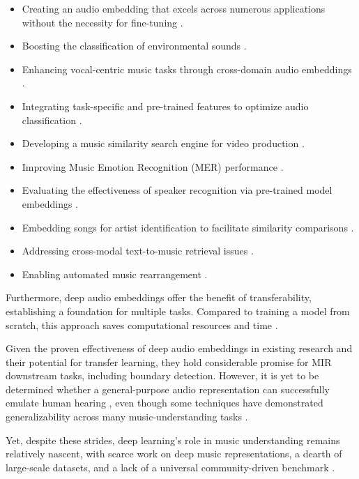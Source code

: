 \begin{itemize}
\item Creating an audio embedding that excels across numerous applications without the necessity for fine-tuning \cite{Turian2022HEAR:Representations}.
\item Boosting the classification of environmental sounds \cite{CramerLOOKEMBEDDINGS}.
\item Enhancing vocal-centric music tasks through cross-domain audio embeddings \cite{Kim2021LearningLoss}.
\item Integrating task-specific and pre-trained features to optimize audio classification \cite{Hung2022Feature-informedClassification}.
\item Developing a music similarity search engine for video production \cite{epidemic}.
\item Improving Music Emotion Recognition (MER) performance \cite{KohComparisonRecognition}.
\item Evaluating the effectiveness of speaker recognition via pre-trained model embeddings \cite{lightweight}.
\item Embedding songs for artist identification to facilitate similarity comparisons \cite{contentmusicsimtriplet2020}.
\item Addressing cross-modal text-to-music retrieval issues \cite{WonEmotionStories}.
\item Enabling automated music rearrangement \cite{Stoller2018IntuitiveTransitions, Plachouras2023MusicSegmentation}.
\end{itemize}

Furthermore, deep audio embeddings offer the benefit of transferability, establishing a foundation for multiple tasks. Compared to training a model from scratch, this approach saves computational resources and time \cite{transferMIR2013, CifkaDeepTransfer, Ding2023AudioClassification}.

Given the proven effectiveness of deep audio embeddings in existing research and their potential for transfer learning, they hold considerable promise for MIR downstream tasks, including boundary detection. However, it is yet to be determined whether a general-purpose audio representation can successfully emulate human hearing \cite{Turian2022HEAR:Representations}, even though some techniques have demonstrated generalizability across many music-understanding tasks \cite{Li2023MERT:Training, Kim2020OneStrategies}.

Yet, despite these strides, deep learning's role in music understanding remains relatively nascent, with scarce work on deep music representations, a dearth of large-scale datasets, and a lack of a universal community-driven benchmark \cite{Turian2022HEAR:Representations, Yuan2023MARBLE:Evaluation}.